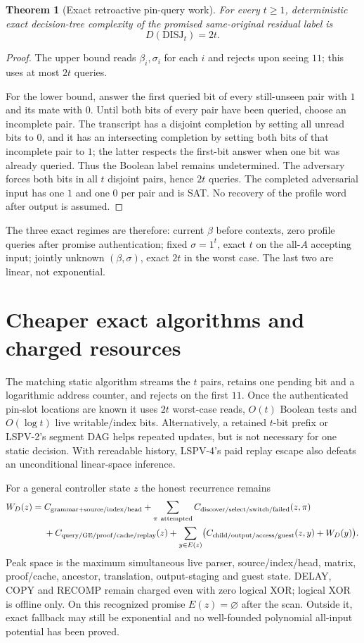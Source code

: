 \documentclass[11pt]{article}
\newtheorem{theorem}{Theorem}
\begin{document}
\begin{theorem}[Exact retroactive pin-query work]
For every $t\ge1$, deterministic exact decision-tree complexity of the promised
same-original residual label is
\[
D(\mathrm{DISJ}_t)=2t.
\]
\end{theorem}
\begin{proof}
The upper bound reads $\beta_i,\sigma_i$ for each $i$ and rejects upon seeing
$11$; this uses at most $2t$ queries.

For the lower bound, answer the first queried bit of every still-unseen pair with
$1$ and its mate with $0$.  Until both bits of every pair have been queried, choose
an incomplete pair.  The transcript has a disjoint completion by setting all
unread bits to $0$, and it has an intersecting completion by setting both bits of
that incomplete pair to $1$; the latter respects the first-bit answer when one bit
was already queried.  Thus the Boolean label remains undetermined.  The adversary
forces both bits in all $t$ disjoint pairs, hence $2t$ queries.  The completed
adversarial input has one $1$ and one $0$ per pair and is SAT.  No recovery of the
profile word after output is assumed.
\end{proof}

The three exact regimes are therefore: current $\beta$ before contexts, zero
profile queries after promise authentication; fixed $\sigma=1^t$, exact $t$ on the
all-$A$ accepting input; jointly unknown $(\beta,\sigma)$, exact $2t$ in the worst
case.  The last two are linear, not exponential.

\section{Cheaper exact algorithms and charged resources}
The matching static algorithm streams the $t$ pairs, retains one pending bit and a
logarithmic address counter, and rejects on the first $11$.  Once the authenticated
pin-slot locations are known it uses $2t$ worst-case reads, $O(t)$ Boolean tests and
$O(\log t)$ live writable/index bits.  Alternatively, a retained $t$-bit prefix or
LSPV-2's segment DAG helps repeated updates, but is not necessary for one static
decision.  With rereadable history, LSPV-4's paid replay escape also defeats an
unconditional linear-space inference.

For a general controller state $z$ the honest recurrence remains
\[
\begin{aligned}
W_D(z)={}&C_{\rm grammar+source/index/head}
+\sum_{\pi\ {\rm attempted}}C_{\rm discover/select/switch/failed}(z,\pi)\\
&+C_{\rm query/GE/proof/cache/replay}(z)
+\sum_{y\in E(z)}\bigl(C_{\rm child/output/access/guest}(z,y)+W_D(y)\bigr).
\end{aligned}
\]
Peak space is the maximum simultaneous live parser, source/index/head, matrix,
proof/cache, ancestor, translation, output-staging and guest state.  DELAY, COPY and
RECOMP remain charged even with zero logical XOR; logical XOR is offline only.
On this recognized promise $E(z)=\varnothing$ after the scan.  Outside it, exact
fallback may still be exponential and no well-founded polynomial all-input
potential has been proved.
\end{document}
